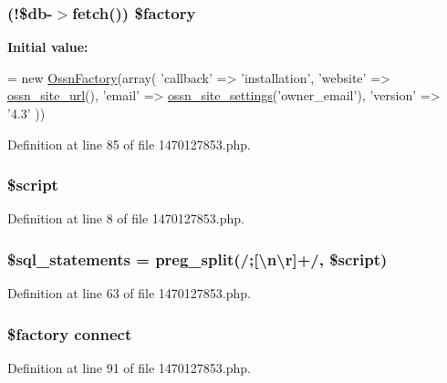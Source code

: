 \subsubsection[{\texorpdfstring{\$factory}{$factory}}]{ (!\$db-\/$>$fetch()) \$factory}\hypertarget{1470127853_8php_a8673dc40c5d9d7451df660e451fbae86}{}\label{1470127853_8php_a8673dc40c5d9d7451df660e451fbae86}
{\bfseries Initial value\+:}
\begin{DoxyCode}
= \textcolor{keyword}{new} \hyperlink{class_ossn_factory}{OssnFactory}(array(
        \textcolor{stringliteral}{'callback'} => \textcolor{stringliteral}{'installation'},
        \textcolor{stringliteral}{'website'} => \hyperlink{ossn_8lib_8system_8php_a2f12f9244f99eccd1225afb76ef2ab65}{ossn\_site\_url}(),
        \textcolor{stringliteral}{'email'} => \hyperlink{ossn_8lib_8system_8php_a610e2045b8a86c09f777b4d82e24e34c}{ossn\_site\_settings}(\textcolor{stringliteral}{'owner\_email'}),
        \textcolor{stringliteral}{'version'} => \textcolor{stringliteral}{'4.3'}
))
\end{DoxyCode}


Definition at line 85 of file 1470127853.\+php.

\subsubsection[{\texorpdfstring{\$script}{$script}}]{\setlength{\rightskip}{0pt plus 5cm}\$script}\hypertarget{1470127853_8php_af1de23de512bb5bf634c157dbb1b7758}{}\label{1470127853_8php_af1de23de512bb5bf634c157dbb1b7758}


Definition at line 8 of file 1470127853.\+php.

\subsubsection[{\texorpdfstring{\$sql\+\_\+statements}{$sql_statements}}]{\setlength{\rightskip}{0pt plus 5cm}\$sql\+\_\+statements = preg\+\_\+split(\textquotesingle{}/;\mbox{[}\textbackslash{}{\bf n\textbackslash{}r}\mbox{]}+/\textquotesingle{}, \$script)}\hypertarget{1470127853_8php_a3406d4f0fded9d6252687e02436fb38b}{}\label{1470127853_8php_a3406d4f0fded9d6252687e02436fb38b}


Definition at line 63 of file 1470127853.\+php.

\subsubsection[{\texorpdfstring{connect}{connect}}]{\setlength{\rightskip}{0pt plus 5cm}\$factory connect}\hypertarget{1470127853_8php_a3fdbedd7713e458f25fcf7dc1f562a3d}{}\label{1470127853_8php_a3fdbedd7713e458f25fcf7dc1f562a3d}


Definition at line 91 of file 1470127853.\+php.


